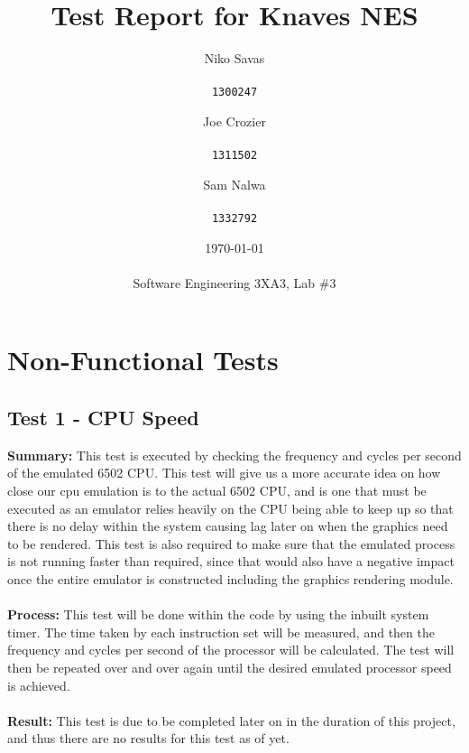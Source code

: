 \documentclass[12pt]{article}
\begin{document}
\title{Test Report for Knaves NES}
\date{\today\\\\
	{\medskip\small Software Engineering 3XA3, Lab \#3}
}
\author{Niko Savas\\\\
	\texttt{1300247}
	\and
	Joe Crozier\\\\
	\texttt{1311502}
	\and
	Sam Nalwa\\\\
	\texttt{1332792}
}

\maketitle

\clearpage
\tableofcontents

\clearpage

\section{Non-Functional Tests}
	\subsection{Test 1 - CPU Speed}
		\textbf{Summary: } This test is executed by checking the frequency and cycles per second of the emulated 6502 CPU. This test will give us a more accurate idea on how close our cpu emulation is to the actual 6502 CPU, and is one that must be executed as an emulator relies heavily on the CPU being able to keep up so that there is no delay within the system causing lag later on when the graphics need to be rendered. This test is also required to make sure that the emulated process is not running faster than required, since that would also have a negative impact once the entire emulator is constructed including the graphics rendering module.\\\\
		\textbf{Process: } This test will be done within the code by using the inbuilt system timer. The time taken by each instruction set will be measured, and then the frequency and cycles per second of the processor will be calculated. The test will then be repeated over and over again until the desired emulated processor speed is achieved.\\\\
		\textbf{Result: } This test is due to be completed later on in the duration of this project, and thus there are no results for this test as of yet.
\end{document}
